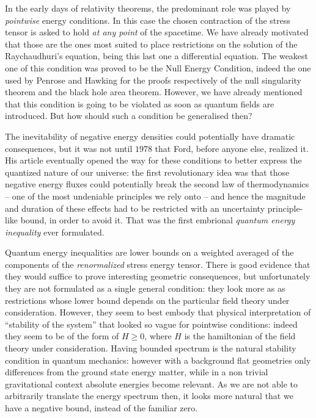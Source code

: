 In the early days of relativity theorems, the predominant role was played by \emph{pointwise} energy conditions. In this case the chosen contraction of the stress tensor is asked to hold \emph{at any point} of the spacetime. We have already motivated that those are the ones most suited to place restrictions on the solution of the Raychaudhuri's equation, being this last one a differential equation. The weakest one of this condition was proved to be the Null Energy Condition, indeed the one used by Penrose and Hawking for the proofs respectively of the null singularity theorem and the black hole area theorem. However, we have already mentioned that this condition is going to be violated as soon as quantum fields are introduced. But how should such a condition be generalised then?

The inevitability of negative energy densities could potentially have dramatic consequences, but it was not until \(1978\) that Ford, before anyone else, realized it. His article eventually opened the way for these conditions to better express the quantized nature of our universe: the first revolutionary idea was that those negative energy fluxes could potentially break the second law of thermodynamics -- one of the most undeniable principles we rely onto -- and hence the magnitude and duration of these effects had to be restricted with an uncertainty principle-like bound, in order to avoid it. That was the first embrional \emph{quantum energy inequality} ever formulated.

Quantum energy inequalities are lower bounds on a weighted averaged of the components of the \emph{renormalized} stress energy tensor. There is good evidence that they would suffice to prove interesting geometric consequences, but unfortunately they are not formulated as a single general condition: they look more as as restrictions whose lower bound depends on the particular field theory under consideration. However, they seem to best embody that physical interpretation of ``stability of the system'' that looked so vague for pointwise conditions: indeed they seem to be of the form of \(H\ge 0\), where \(H\) is the hamiltonian of the field theory under consideration. Having bounded spectrum is the natural stability condition in quantum mechanics: however with a background flat geometries only differences from the ground state energy matter, while in a non trivial gravitational context absolute energies become relevant. As we are not able to arbitrarily translate the energy spectrum then, it looks more natural that we have a negative bound, instead of the familiar zero.

